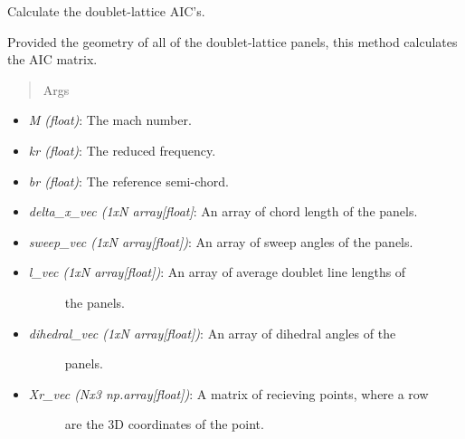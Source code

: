 \documentclass[letterpaper,10pt,english]{sphinxmanual}
\begin{document}
\begin{fulllineitems}
\label{aerodynamics:AeroComBAT.Aerodynamics.calcAIC}
Calculate the doublet-lattice AIC's.

Provided the geometry of all of the doublet-lattice panels, this method
calculates the AIC matrix.
\begin{quote}\begin{description}
\item[{Args}] \leavevmode
\end{description}\end{quote}
\begin{itemize}
\item {} 
\emph{M (float)}: The mach number.

\item {} 
\emph{kr (float)}: The reduced frequency.

\item {} 
\emph{br (float)}: The reference semi-chord.

\item {} 
\emph{delta\_x\_vec (1xN array{[}float{]}}: An array of chord length of the panels.

\item {} 
\emph{sweep\_vec (1xN array{[}float{]})}: An array of sweep angles of the panels.

\item {} \begin{description}
\item[{\emph{l\_vec (1xN array{[}float{]})}: An array of average doublet line lengths of}] \leavevmode
the panels.

\end{description}

\item {} \begin{description}
\item[{\emph{dihedral\_vec (1xN array{[}float{]})}: An array of dihedral angles of the}] \leavevmode
panels.

\end{description}

\item {} \begin{description}
\item[{\emph{Xr\_vec (Nx3 np.array{[}float{]})}: A matrix of recieving points, where a row}] \leavevmode
are the 3D coordinates of the point.


\end{description}
\end{itemize}
\end{fulllineitems}
\end{document}
